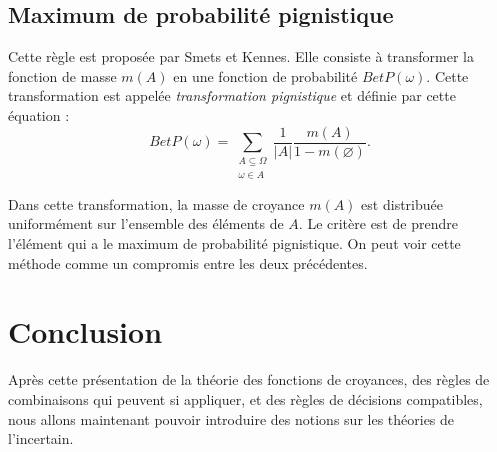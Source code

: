 \subsection{Maximum de probabilité pignistique}

Cette règle est proposée par Smets et Kennes. Elle consiste à transformer la fonction
de masse $m(A)$ en une fonction de probabilité $BetP(\omega)$. Cette transformation
est appelée \emph{transformation pignistique} et définie par cette équation :
\begin{equation}
BetP(\omega) = \sum_{\substack{A \subseteq \Omega \\
\omega \in A}} \frac{1}{|A|}  \frac{m(A)}{1-m(\varnothing)}.
\end{equation}

Dans cette transformation, la masse de croyance $m(A)$ est distribuée uniformément
sur l’ensemble des éléments de $A$. Le critère est de prendre l'élément qui a le
maximum de probabilité pignistique. On peut voir cette méthode comme un compromis
entre les deux précédentes.

{}
\section*{Conclusion}

Après cette présentation de la théorie des fonctions de
croyances, des règles de combinaisons qui peuvent si appliquer,
et des règles de décisions compatibles, nous allons maintenant pouvoir introduire
des notions sur les théories de l'incertain.